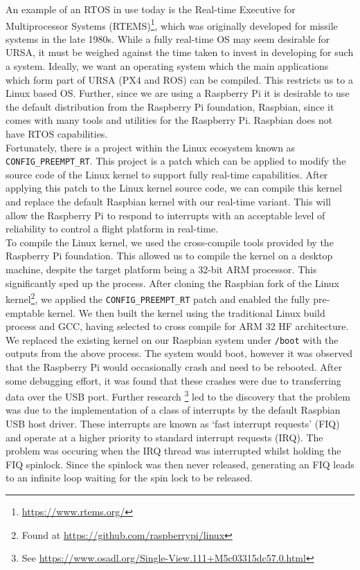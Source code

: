 \documentclass[capstone_report.tex]{subfiles}
\begin{document}
    An example of an RTOS in use today is the Real-time Executive for Multiprocessor Systems (RTEMS)\footnote{\url{https://www.rtems.org/}}, which was originally developed for missile systems in the late 1980s. While a fully real-time OS may seem desirable for URSA, it must be weighed against the time taken to invest in developing for such a system. Ideally, we want an operating system which the main applications which form part of URSA (PX4 and ROS) can be compiled. This restricts us to a Linux based OS. Further, since we are using a Raspberry Pi it is desirable to use the default distribution from the Raspberry Pi foundation, Raspbian, since it comes with many tools and utilities for the Raspberry Pi. Raspbian does not have RTOS capabilities.\\

    Fortunately, there is a project within the Linux ecosystem known as \texttt{CONFIG\_PREEMPT\_RT}. This project is a patch which can be applied to modify the source code of the Linux kernel to support fully real-time capabilities. After applying this patch to the Linux kernel source code, we can compile this kernel and replace the default Raspbian kernel with our real-time variant. This will allow the Raspberry Pi to respond to interrupts with an acceptable level of reliability to control a flight platform in real-time.\\

    To compile the Linux kernel, we used the cross-compile tools provided by the Raspberry Pi foundation. This allowed us to compile the kernel on a desktop machine, despite the target platform being a 32-bit ARM processor. This significantly sped up the process. After cloning the Raspbian fork of the Linux kernel\footnote{Found at \url{https://github.com/raspberrypi/linux}}, we applied the \texttt{CONFIG\_PREEMPT\_RT} patch and enabled the fully pre-emptable kernel. We then built the kernel using the traditional Linux build process and GCC, having selected to cross compile for ARM 32 HF architecture.\\

    We replaced the existing kernel on our Raspbian system under \texttt{/boot} with the outputs from the above process. The system would boot, however it was observed that the Raspberry Pi would occasionally crash and need to be rebooted. After some debugging effort, it was found that these crashes were due to transferring data over the USB port. Further research \footnote{See \url{https://www.osadl.org/Single-View.111+M5c03315dc57.0.html}} led to the discovery that the problem was due to the implementation of a class of interrupts by the default Raspbian USB host driver. These interrupts are known as `fast interrupt requests' (FIQ) and operate at a higher priority to standard interrupt requests (IRQ). The problem was occuring when the IRQ thread was interrupted whilst holding the FIQ spinlock. Since the spinlock was then never released, generating an FIQ leads to an infinite loop waiting for the spin lock to be released. \\
\end{document}
